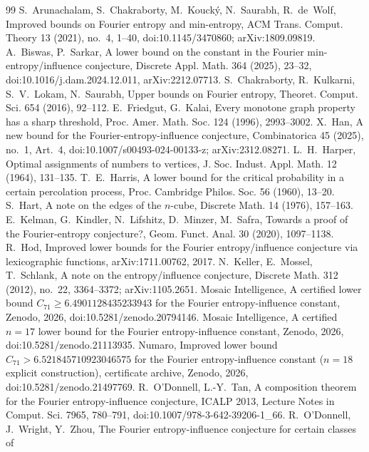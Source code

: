 \documentclass[11pt]{amsart}
\theoremstyle{remark}
\begin{document}
\begin{thebibliography}{99}
 S.~Arunachalam, S.~Chakraborty, M.~Kouck\'y, N.~Saurabh, R.~de~Wolf, Improved bounds on Fourier
entropy and min-entropy, ACM Trans. Comput. Theory 13 (2021), no.~4, 1--40, doi:10.1145/3470860; arXiv:1809.09819.
 A.~Biswas, P.~Sarkar, A lower bound on the constant in the Fourier min-entropy/influence conjecture,
Discrete Appl. Math. 364 (2025), 23--32, doi:10.1016/j.dam.2024.12.011, arXiv:2212.07713.
 S.~Chakraborty, R.~Kulkarni, S.~V.~Lokam, N.~Saurabh, Upper bounds on Fourier entropy, Theoret.
Comput. Sci. 654 (2016), 92--112.
 E.~Friedgut, G.~Kalai, Every monotone graph property has a sharp threshold, Proc. Amer. Math. Soc.
124 (1996), 2993--3002.
 X.~Han, A new bound for the Fourier-entropy-influence conjecture, Combinatorica 45 (2025), no.~1,
Art.~4, doi:10.1007/s00493-024-00133-z; arXiv:2312.08271.
 L.~H.~Harper, Optimal assignments of numbers to vertices, J. Soc. Indust. Appl. Math. 12 (1964),
131--135.
 T.~E.~Harris, A lower bound for the critical probability in a certain percolation process, Proc.
Cambridge Philos. Soc. 56 (1960), 13--20.
 S.~Hart, A note on the edges of the $n$-cube, Discrete Math. 14 (1976), 157--163.
 E.~Kelman, G.~Kindler, N.~Lifshitz, D.~Minzer, M.~Safra, Towards a proof of the
Fourier-entropy conjecture?, Geom. Funct. Anal. 30 (2020), 1097--1138.
 R.~Hod, Improved lower bounds for the Fourier entropy/influence conjecture via lexicographic functions,
arXiv:1711.00762, 2017.
 N.~Keller, E.~Mossel, T.~Schlank, A note on the entropy/influence conjecture, Discrete Math. 312
(2012), no.~22, 3364--3372; arXiv:1105.2651.
 Mosaic Intelligence, A certified lower bound $C_{71}\ge 6.4901128435233943$ for the Fourier entropy-influence constant, Zenodo, 2026, doi:10.5281/zenodo.20794146.
 Mosaic Intelligence, A certified $n=17$ lower bound for the Fourier entropy-influence constant, Zenodo, 2026, doi:10.5281/zenodo.21113935.
 Numaro, Improved lower bound $C_{71}>6.521845710923046575$ for the Fourier entropy-influence constant ($n=18$ explicit construction), certificate archive, Zenodo, 2026, doi:10.5281/zenodo.21497769.
 R.~O'Donnell, L.-Y.~Tan, A composition theorem for the Fourier entropy-influence conjecture, ICALP 2013,
Lecture Notes in Comput. Sci. 7965, 780--791, doi:10.1007/978-3-642-39206-1\_66.
 R.~O'Donnell, J.~Wright, Y.~Zhou, The Fourier entropy-influence conjecture for certain classes of

\end{thebibliography}
\end{document}
